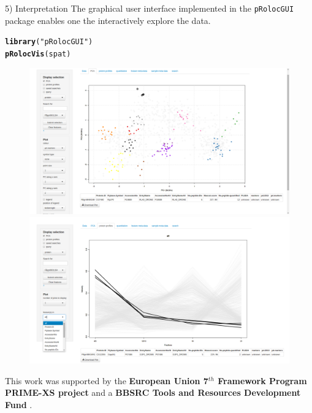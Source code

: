 \documentclass[final]{beamer}\usepackage[]{graphicx}\usepackage[]{color}
\makeatletter
\newcommand{\hlstr}[1]{\textcolor[rgb]{0.192,0.494,0.8}{#1}}%
\newcommand{\hlstd}[1]{\textcolor[rgb]{0.345,0.345,0.345}{#1}}%
\newcommand{\hlkwd}[1]{\textcolor[rgb]{0.737,0.353,0.396}{\textbf{#1}}}%
\newenvironment{kframe}{%
 \def\at@end@of@kframe{}%
 \ifinner\ifhmode%
  \def\at@end@of@kframe{\end{minipage}}%
  \begin{minipage}{\columnwidth}%
 \fi\fi%
 \def\FrameCommand##1{\hskip\@totalleftmargin \hskip-\fboxsep
 \colorbox{shadecolor}{##1}\hskip-\fboxsep
     \hskip-\linewidth \hskip-\@totalleftmargin \hskip\columnwidth}%
 \MakeFramed {\advance\hsize-\width
   \@totalleftmargin\z@ \linewidth\hsize
   \@setminipage}}%
 {\par\unskip\endMakeFramed%
 \at@end@of@kframe}
\newenvironment{knitrout}{}{} %
\newcommand{\Rpackage}[1]{{\mbox{\texttt{#1}}}}
\makeatother
\begin{document}
\begin{frame}[fragile]
\begin{columns}
\begin{column}{.48\textwidth}

      \begin{block}{5) Interpretation}
        The graphical user interface implemented in the
        \Rpackage{pRolocGUI} package enables one the interactively
        explore the data.
\begin{knitrout}
\color{fgcolor}\begin{kframe}
\begin{alltt}
\hlkwd{library}\hlstd{(}\hlstr{"pRolocGUI"}\hlstd{)}
\hlkwd{pRolocVis}\hlstd{(spat)}
\end{alltt}
\end{kframe}
\end{knitrout}
      \end{block}
      \begin{figure}
        \centering
        \includegraphics[width=.5\linewidth]{./figures/gui1.png}
        \includegraphics[width=.5\linewidth]{./figures/gui2.png}
      \end{figure}

      {\small This work was supported by the \textbf{European Union 7$^{th}$
        Framework Program PRIME-XS project} and a \textbf{BBSRC Tools and
        Resources Development Fund}
.}

    \end{column}    
  \end{columns}
\end{frame}
\end{document}
